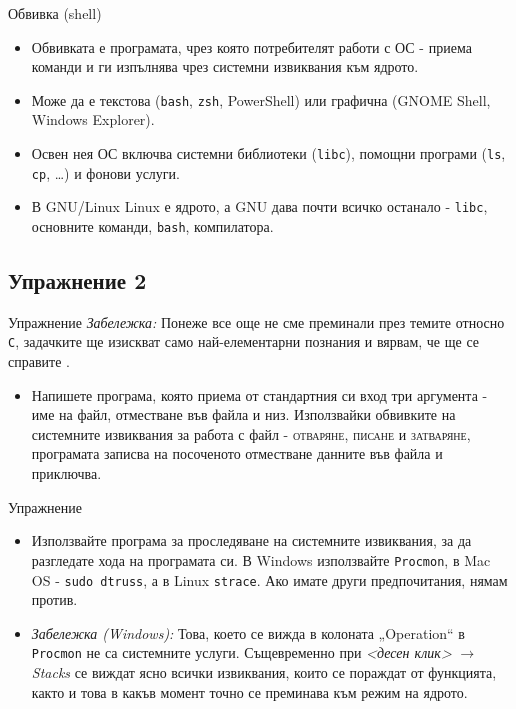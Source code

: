 \documentclass[14pt, aspectratio=169]{beamer}
\begin{document}
\begin{frame}{Обвивка (shell)}
  \begin{itemize}
    \item Обвивката е програмата, чрез която потребителят работи с ОС - приема
      команди и ги изпълнява чрез системни извиквания към ядрото.
    \item Може да е текстова (\texttt{bash}, \texttt{zsh}, PowerShell) или
      графична (GNOME Shell, Windows Explorer).
    \item Освен нея ОС включва системни библиотеки (\texttt{libc}), помощни
      програми (\texttt{ls}, \texttt{cp}, \dots) и фонови услуги.
    \item В GNU/Linux Linux е ядрото, а GNU дава почти всичко останало -
      \texttt{libc}, основните команди, \texttt{bash}, компилатора.
  \end{itemize}
\end{frame}

\subsection{Упражнение 2}

\begin{frame}{Упражнение}
  \emph{Забележка:} Понеже все още не сме преминали през темите относно
  \texttt{C}, задачките ще изискват само най-елементарни познания и вярвам, че
  ще се справите \smiley.
  \begin{itemize}
    \item Напишете програма, която приема от стандартния си вход три аргумента
      - име на файл, отместване във файла и низ. Използвайки обвивките на
      системните извиквания за работа с файл - {\rmfamily\textsc{отваряне}},
      {\rmfamily\textsc{писане}} и {\rmfamily\textsc{затваряне}}, програмата
      записва на посоченото отместване данните във файла и приключва.
  \end{itemize}
\end{frame}

\begin{frame}{Упражнение}
  \begin{itemize}
    \item Използвайте програма за проследяване на системните извиквания, за да
      разгледате хода на програмата си. В Windows използвайте
      \texttt{Procmon}, в Mac OS - \texttt{sudo dtruss}, а в Linux
      \texttt{strace}. Ако имате други предпочитания, нямам против.
    \item \emph{Забележка (Windows):} Това, което се вижда в колоната
      „Operation“ в \texttt{Procmon} не са системните услуги. Същевременно при
      \emph{\textless десен клик\textgreater} $\rightarrow$ \emph{Stacks} се виждат ясно всички
      извиквания, които се пораждат от функцията, както и това в какъв момент
      точно се преминава към режим на ядрото.
  \end{itemize}
\end{frame}
\end{document}
